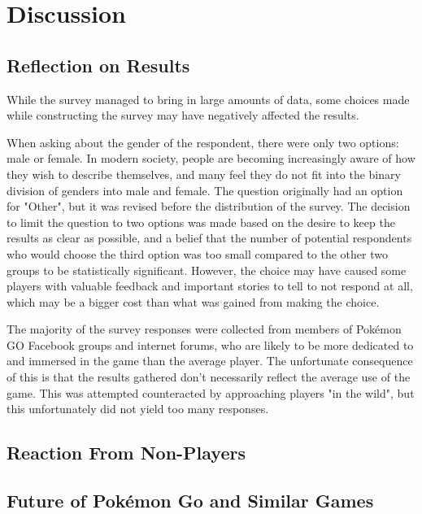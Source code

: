 
\chapter{Discussion}

\section{Reflection on Results}


While the survey managed to bring in large amounts of data, some choices made while constructing the survey may have negatively affected the results.

When asking about the gender of the respondent, there were only two options: male or female. In modern society, people are becoming increasingly aware of how they wish to describe themselves, and many feel they do not fit into the binary division of genders into male and female. The question originally had an option for "Other", but it was revised before the distribution of the survey. The decision to limit the question to two options was made based on the desire to keep the results as clear as possible, and a belief that the number of potential respondents who would choose the third option was too small compared to the other two groups to be statistically significant. However, the choice may have caused some players with valuable feedback and important stories to tell to not respond at all, which may be a bigger cost than what was gained from making the choice.

The majority of the survey responses were collected from members of Pokémon GO Facebook groups and internet forums, who are likely to be more dedicated to and immersed in the game than the average player. The unfortunate consequence of this is that the results gathered don't necessarily reflect the average use of the game. This was attempted counteracted by approaching players "in the wild", but this unfortunately did not yield too many responses.



\section{Reaction From Non-Players}


\section{Future of Pokémon Go and Similar Games}

